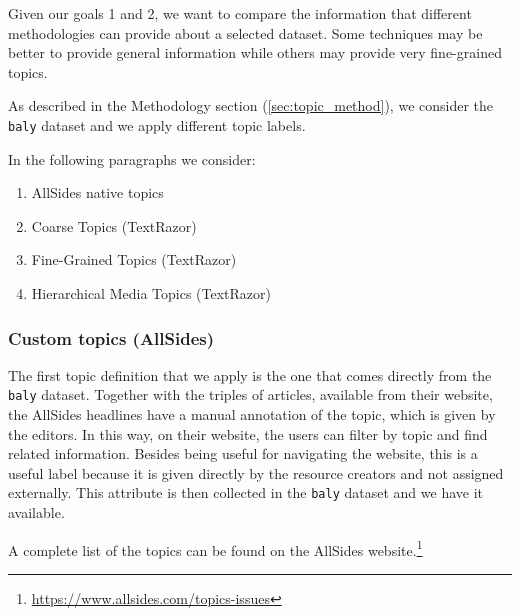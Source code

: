 



Given our goals 1 and 2, we want to compare the information that different methodologies can provide about a selected dataset. Some techniques may be better to provide general information while others may provide very fine-grained topics.

As described in the Methodology section (\ref{sec:topic_method}), we consider the \texttt{baly} dataset and we apply different topic labels.

In the following paragraphs we consider:

\begin{enumerate}
    \item AllSides native topics
    \item Coarse Topics (TextRazor)
    \item Fine-Grained Topics (TextRazor)
    \item Hierarchical Media Topics (TextRazor)
\end{enumerate}


\subsubsection{\statusgreen Custom topics (AllSides)}

The first topic definition that we apply is the one that comes directly from the \texttt{baly} dataset. Together with the triples of articles, available from their website, the AllSides headlines have a manual annotation of the topic, which is given by the editors. In this way, on their website, the users can filter by topic and find related information.
Besides being useful for navigating the website, this is a useful label because it is given directly by the resource creators and not assigned externally.
This attribute is then collected in the \texttt{baly} dataset and we have it available.

A complete list of the topics can be found on the AllSides website.\footnote{\url{https://www.allsides.com/topics-issues}}

